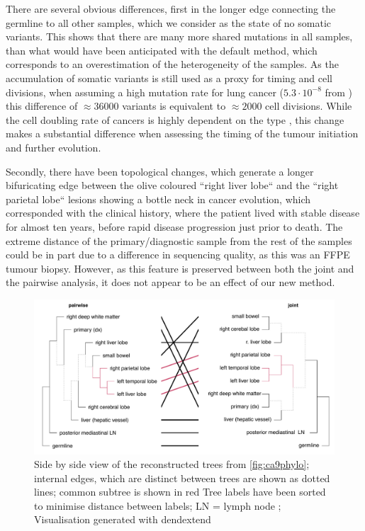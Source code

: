 There are several obvious differences, first in the longer edge connecting the germline to all other samples, which we consider as the state of no somatic variants. This shows that there are many more shared mutations in all samples, than what would have been anticipated with the default method, which corresponds to an overestimation of the heterogeneity of the samples. As the accumulation of somatic variants is still used as a proxy for timing and cell divisions, when assuming a high mutation rate for lung cancer ($5.3 \cdot 10^{-8}$ from \citeauthor*{Werner2020} \cite{Werner2020}) this difference of $\approx 36000$ variants is equivalent to $\approx 2000$ cell divisions. While the cell doubling rate of cancers is highly dependent on the type \cite{Arai1994}, this change makes a substantial difference when assessing the timing of the tumour initiation and further evolution. 

Secondly, there have been topological changes, which generate a longer bifuricating edge between the olive coloured ``right liver lobe`` and the ``right parietal lobe`` lesions showing a bottle neck in cancer evolution, which corresponded with the clinical history, where the patient lived with stable disease for almost ten years, before rapid disease progression just prior to death. The extreme distance of the primary/diagnostic sample from the rest of the samples could be in part due to a difference in sequencing quality, as this was an FFPE tumour biopsy. However, as this feature is preserved between both the joint and the pairwise analysis, it does not appear to be an effect of our new method.

\begin{figure}[ht]
\centering
\includegraphics[width=.99\linewidth]{Figures/jointVariantCalling/tanglePhyloCA9.pdf}
\caption[Tanglegram of the reconstructed phylogenies]{Side by side view of the reconstructed trees from \autoref{fig:ca9phylo}; internal edges, which are distinct between trees are shown as dotted lines; common subtree is shown in red  Tree labels have been sorted to minimise distance between labels; LN = lymph node ; Visualisation generated with dendextend \cite{Galili2015}}\label{fig:tanglePhyloCA9}
\end{figure}

